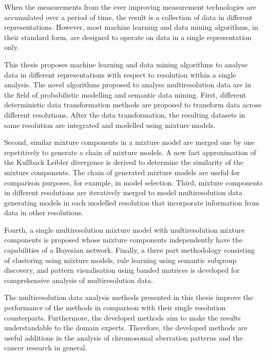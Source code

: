 \documentclass[10pt]{article}
\begin{document}
\setlength{\parindent}{3mm}
\small

\noindent When the measurements from the ever improving measurement technologies are accumulated over a period of time, the result is a collection of data in different representations. However, most machine learning and data mining algorithms, in their standard form, are designed to operate on data in a single representation only.


This thesis proposes machine learning and data mining algorithms to analyse data in different representations with respect to resolution within a single analysis. The novel algorithms proposed to analyse multiresolution data are in the field of probabilistic modelling and semantic data mining. First, different deterministic data transformation methods are proposed to transform data across different resolutions. After the data transformation, the resulting datasets in same resolution are integrated and modelled using mixture models.

Second, similar mixture components in a mixture model are merged one by one repetitively to generate a chain of mixture models. A new fast approximation of the Kullback Leibler divergence is derived to determine the similarity of the mixture components. The chain of generated mixture models are useful for comparison purposes, for example, in model selection. Third, mixture components in different resolutions are iteratively merged to model multiresolution data generating models in each modelled resolution that incorporate information from data in other resolutions.

Fourth, a single multiresolution mixture model with multiresolution mixture components is proposed whose mixture components independently have the capabilities of a Bayesian network. Finally, a three part methodology consisting of clustering using mixture models, rule learning using semantic subgroup discovery, and pattern visualisation using banded matrices is developed for comprehensive analysis of multiresolution data.

The multiresolution data analysis methods presented in this thesis improve the performance of the methods in comparison with their single resolution counterparts. Furthermore, the developed methods aim to make the results understandable to the domain experts. Therefore, the developed methods are useful additions in the analysis of chromosomal aberration patterns and the cancer research in general.
\end{document}
